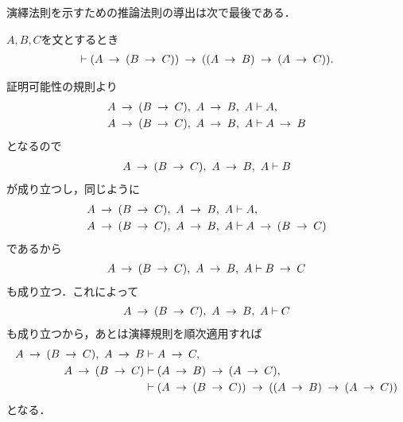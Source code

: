 	演繹法則を示すための推論法則の導出は次で最後である．
	
	\begin{screen}
		\begin{logicalthm}[含意の分配則]
		\label{logicalthm:distributive_law_of_implication}
			$A,B,C$を文とするとき
			\begin{align}
				\vdash (A \rarrow (B \rarrow C)) \rarrow ((A \rarrow B) \rarrow (A \rarrow C)).
			\end{align}
		\end{logicalthm}
	\end{screen}
	
	\begin{prf}
		証明可能性の規則より
		\begin{align}
			A \rarrow (B \rarrow C),\ A \rarrow B,\ A
			&\vdash A, \\
			A \rarrow (B \rarrow C),\ A \rarrow B,\ A
			&\vdash A \rarrow B
		\end{align}
		となるので
		\begin{align}
			A \rarrow (B \rarrow C),\ A \rarrow B,\ A
			\vdash B
		\end{align}
		が成り立つし，同じように
		\begin{align}
			A \rarrow (B \rarrow C),\ A \rarrow B,\ A
			&\vdash A, \\
			A \rarrow (B \rarrow C),\ A \rarrow B,\ A
			&\vdash A \rarrow (B \rarrow C)
		\end{align}
		であるから
		\begin{align}
			A \rarrow (B \rarrow C),\ A \rarrow B,\ A
			\vdash B \rarrow C
		\end{align}
		も成り立つ．これによって
		\begin{align}
			A \rarrow (B \rarrow C),\ A \rarrow B,\ A
			\vdash C
		\end{align}
		も成り立つから，あとは演繹規則を順次適用すれば
		\begin{align}
			A \rarrow (B \rarrow C),\ A \rarrow B
			&\vdash A \rarrow C, \\
			A \rarrow (B \rarrow C)
			&\vdash (A \rarrow B) \rarrow (A \rarrow C), \\
			&\vdash (A \rarrow (B \rarrow C)) \rarrow ((A \rarrow B) \rarrow (A \rarrow C))
		\end{align}
		となる．
		\QED
	\end{prf}
	
